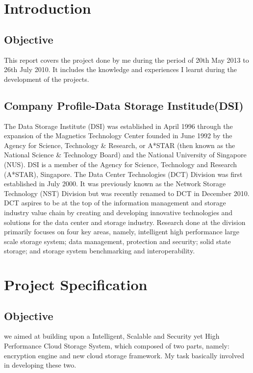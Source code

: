 \documentclass[10pt]{report}
\begin{document}
	\chapter{Introduction}
		\section{Objective}
		This report covers the project done by me during the period of 20th May 2013 to 26th July 2010. It includes the knowledge and experiences I learnt during the development of the projects.
		
		\section{Company Profile-Data Storage Institude(DSI)}
		The Data Storage Institute (DSI) was established in April 1996 through the expansion of the Magnetics Technology Center founded in June 1992 by the Agency for Science, Technology \& Research, or A*STAR (then known as the National Science \& Technology Board) and the National University of Singapore (NUS). DSI is a member of the Agency for Science, Technology and Research (A*STAR), Singapore.
		The Data Center Technologies (DCT) Division was first established in July 2000. It was previously known as the Network Storage Technology (NST) Division but was recently renamed to DCT in December 2010. DCT aspires to be at the top of the information management and storage industry value chain by creating and developing innovative technologies and solutions for the data center and storage industry. Research done at the division primarily focuses on four key areas, namely, intelligent high performance large scale storage system; data management, protection and security; solid state storage; and storage system benchmarking and interoperability.
	\chapter{Project Specification}
		\section{Objective}
		we aimed at building upon a Intelligent, Scalable and Security  yet High Performance Cloud Storage System, which composed of two parts, namely: encryption engine and new cloud storage framework.
		My task basically involved in developing these two.
\end{document}
